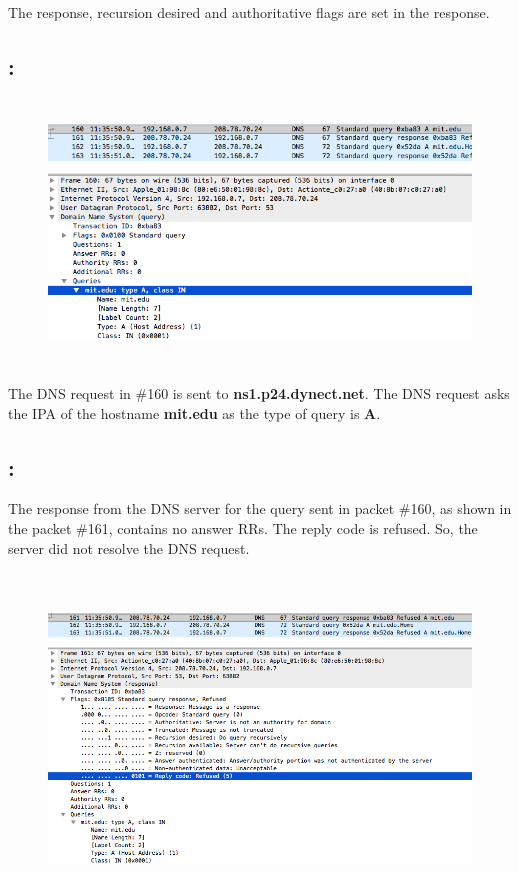 \documentclass[]{report}
\begin{document}
The response, recursion desired and authoritative flags are set in the response. 

\subsection{:}

\begin{figure}[H]
	\vspace{0pt}
	\includegraphics[height = 200pt, keepaspectratio]{Snapshots/q2/2_3.png}
\end{figure}

The DNS request in \#160 is sent to \textbf{ns1.p24.dynect.net}. The DNS request asks the IPA of the hostname \textbf{mit.edu} as the type of query is \textbf{A}.

\subsection{:}

The response from the DNS server for the query sent in packet \#160, as shown in the packet \#161, contains no answer RRs. The reply code is refused. So, the server did not resolve the DNS request. 

\begin{figure}[H]
	\vspace{0pt}
	\includegraphics[height = 250pt, keepaspectratio]{Snapshots/q2/2_4.png}
\end{figure}
\end{document}
